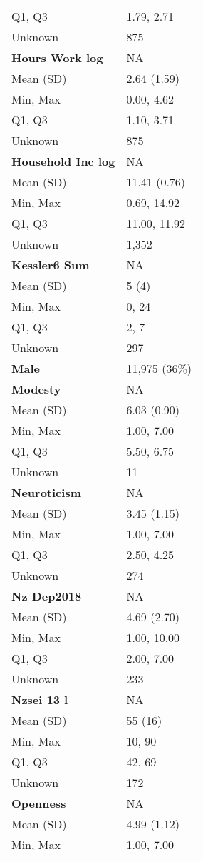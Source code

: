 \documentclass[
  single column]{article}
\begin{document}
\begin{longtable}[]{@{}ll@{}}
Q1, Q3 & 1.79, 2.71 \\
Unknown & 875 \\
\textbf{Hours Work log} & NA \\
Mean (SD) & 2.64 (1.59) \\
Min, Max & 0.00, 4.62 \\
Q1, Q3 & 1.10, 3.71 \\
Unknown & 875 \\
\textbf{Household Inc log} & NA \\
Mean (SD) & 11.41 (0.76) \\
Min, Max & 0.69, 14.92 \\
Q1, Q3 & 11.00, 11.92 \\
Unknown & 1,352 \\
\textbf{Kessler6 Sum} & NA \\
Mean (SD) & 5 (4) \\
Min, Max & 0, 24 \\
Q1, Q3 & 2, 7 \\
Unknown & 297 \\
\textbf{Male} & 11,975 (36\%) \\
\textbf{Modesty} & NA \\
Mean (SD) & 6.03 (0.90) \\
Min, Max & 1.00, 7.00 \\
Q1, Q3 & 5.50, 6.75 \\
Unknown & 11 \\
\textbf{Neuroticism} & NA \\
Mean (SD) & 3.45 (1.15) \\
Min, Max & 1.00, 7.00 \\
Q1, Q3 & 2.50, 4.25 \\
Unknown & 274 \\
\textbf{Nz Dep2018} & NA \\
Mean (SD) & 4.69 (2.70) \\
Min, Max & 1.00, 10.00 \\
Q1, Q3 & 2.00, 7.00 \\
Unknown & 233 \\
\textbf{Nzsei 13 l} & NA \\
Mean (SD) & 55 (16) \\
Min, Max & 10, 90 \\
Q1, Q3 & 42, 69 \\
Unknown & 172 \\
\textbf{Openness} & NA \\
Mean (SD) & 4.99 (1.12) \\
Min, Max & 1.00, 7.00 \\

\end{longtable}
\end{document}
